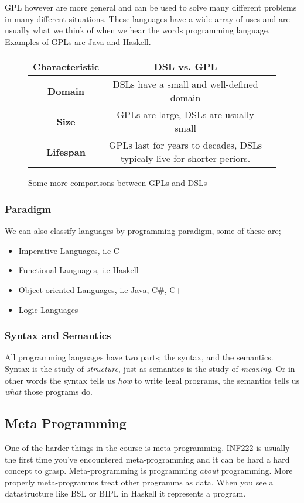     \Gls{GPL} however are more general and can be used to solve many different problems in many different situations.
    These languages have a wide array
    of uses and are usually what we think of when we hear the words programming language. Examples of GPLs are Java and Haskell.\\
    \begin{figure*}[!h]
        \begin{tabular}{|c|c|c}
            \hline
            \textbf{Characteristic} &\textbf{DSL vs. GPL}\\
            \hline
            \textbf{Domain} & DSLs have a small and well-defined domain\\
            \hline
            \textbf{Size} &GPLs are large, DSLs are usually small\\
            \hline
            \textbf{Lifespan} &GPLs last for years to decades, DSLs typicaly live for shorter periors.\\
            \hline
        \end{tabular}%
        \caption{Some more comparisons between GPLs and DSLs}
    \end{figure*}%

    \subsubsection*{Paradigm}
    We can also classify languages by programming paradigm, some of these are; 
    \begin{itemize}
        \item Imperative Languages, i.e C
        \item Functional Languages, i.e Haskell
        \item Object-oriented Languages, i.e Java, C\#, C++
        \item Logic Languages
    \end{itemize}

    \subsubsection*{Syntax and Semantics}
    All programming languages have two parts; the \gls{syntax}, and the \gls{semantics}.\\
    Syntax is the study of \textit{structure}, just as semantics is the study of \textit{meaning}. Or in other words
    the syntax tells us \textit{how} to write legal programs, the semantics tells us \textit{what} those programs do. 

    \subsection{Meta Programming}
    One of the harder things in the course is \gls{meta-programming}. INF222 is usually the first time you've encountered meta-programming and it can be hard a hard concept to grasp. 
    Meta-programming is programming \textit{about} programming. More properly meta-programms treat other programms as data. When you see a datastructure like \gls{BSL} or \gls{BIPL} in Haskell it
    represents a program.